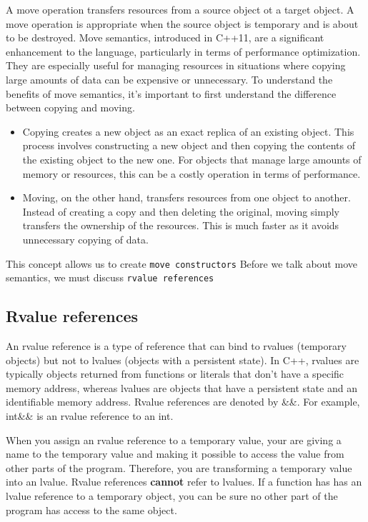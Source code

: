 \documentclass{report}
\begin{document}
\begin{concept}
    \pagebreak
    \bigbreak \noindent 
    \begin{concept}
       A move operation transfers resources from a source object ot a target object. A move operation is appropriate when the source object is temporary and is about to be destroyed. 
       \bigbreak \noindent 
        Move semantics, introduced in C++11, are a significant enhancement to the language, particularly in terms of performance optimization. They are especially useful for managing resources in situations where copying large amounts of data can be expensive or unnecessary. To understand the benefits of move semantics, it's important to first understand the difference between copying and moving.
        \begin{itemize}
            \item Copying creates a new object as an exact replica of an existing object. This process involves constructing a new object and then copying the contents of the existing object to the new one. For objects that manage large amounts of memory or resources, this can be a costly operation in terms of performance.
            \item Moving, on the other hand, transfers resources from one object to another. Instead of creating a copy and then deleting the original, moving simply transfers the ownership of the resources. This is much faster as it avoids unnecessary copying of data.
        \end{itemize}
        \bigbreak \noindent 
        This concept allows us to create \texttt{move constructors}
        \bigbreak \noindent 
        Before we talk about move semantics, we must discuss \texttt{rvalue references}
    \end{concept}
    \bigbreak \noindent 
    \subsection{Rvalue references}
    \bigbreak \noindent 
    An rvalue reference is a type of reference that can bind to rvalues (temporary objects) but not to lvalues (objects with a persistent state). In C++, rvalues are typically objects returned from functions or literals that don't have a specific memory address, whereas lvalues are objects that have a persistent state and an identifiable memory address.
    \bigbreak \noindent 
    Rvalue references are denoted by \&\&. For example, int\&\& is an rvalue reference to an int.
    \bigbreak \noindent 
    \begin{notebox}
        When you assign an rvalue reference to a temporary value, your are giving a name to the temporary value and making it possible to access the value from other parts of the program. Therefore, you are transforming a temporary value into an lvalue. Rvalue references \textbf{cannot} refer to lvalues.
        \bigbreak \noindent 
        If a function has has an lvalue reference to a temporary object, you can be sure no other part of the program has access to the same object.
    \end{notebox}


\end{concept}
\end{document}
